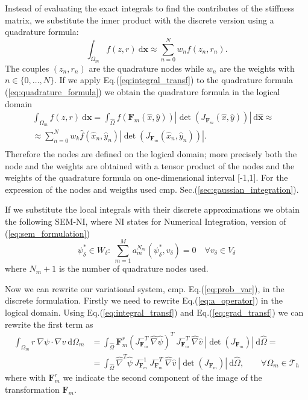 Instead of evaluating the exact integrals to find the contributes of the stiffness matrix, we substitute the inner product with the discrete version using a quadrature formula:
\begin{equation}\label{eq:quadrature_formula}
  \int_{\Omega_m} f(z,r)\:\mathrm{d}\mathbf{x} \approx\sum_{n=0}^{N}w_n f(z_n,r_n).
\end{equation}
The couples $(z_n,r_n)$ are the quadrature nodes while $w_n$ are the weights with $n\in\{0,\dots,N\}$. If we apply Eq.(\ref{eq:integral_transf}) to the quadrature formula (\ref{eq:quadrature_formula}) we obtain the quadrature formula in the logical domain
\begin{equation}
  \begin{split}
    \int_{\Omega_m} f(z,r)\:\mathrm{d}\mathbf{x} =\int_{\hat{\Omega}}f(\mathbf{F}_m(\hat{x},\hat{y}))|\det(J_{\mathbf{F}_m}(\hat{x},\hat{y}))|\:\mathrm{d}\hat{\mathbf{x}}\approx&\\
    \approx\sum_{n=0}^{N}w_k \hat{f}(\hat{x}_n,\hat{y}_n)|\det(J_{\mathbf{F}_m}(\hat{x}_n,\hat{y}_n))|.\\
  \end{split}
\end{equation}
Therefore the nodes are defined on the logical domain; more precisely both the node and the weights are obtained with a tensor product of the nodes and the weights of the quadrature formula
on one-dimensional interval [-1,1]. For the expression of the nodes and weigths used cmp. Sec.(\ref{sec:gaussian_integration}).

If we substitute the local integrals with their discrete approximations we obtain the following SEM-NI, where NI states for Numerical Integration, version of (\ref{eq:sem_formulation})
\begin{equation}\label{eq:SEM_NI}
  \psi^*_\delta\in W_\delta:\: \sum_{m=1}^M a_m^{N_m}(\psi^*_\delta,v_\delta)=0\quad\forall v_\delta\in V_\delta
\end{equation}
where $N_m+1$ is the number of quadrature nodes used.
\medskip

Now we can rewrite our variational system, cmp. Eq.(\ref{eq:prob_var}), in the discrete formulation. Firstly we need to rewrite Eq.(\ref{eq:a_operator}) in the logical domain. Using Eq.(\ref{eq:integral_transf}) and Eq.(\ref{eq:grad_transf}) we can rewrite the first term as
\begin{equation}\label{eq:first_logical}
  \begin{split}
    \int_{\Omega_m}r\:\nabla\psi\cdot\nabla v\:\mathrm{d}\Omega_m &=\int_{\hat{\Omega}} \mathbf{F}^r_m(J_{\mathbf{F}_m}^{-T}\:\hat{\nabla}\hat{\psi})^T\:
    J_{\mathbf{F}_m}^{-T}\:\hat{\nabla}\hat{v}\:|\det(J_{\mathbf{F}_m})|\:\mathrm{d}\hat{\Omega}=\\
    &=\int_{\hat{\Omega}} \hat{\nabla}^T\hat{\psi}\:J_{\mathbf{F}_m}^{-1}\:J_{\mathbf{F}_m}^{-T}\:\hat{\nabla}\hat{v}\:|\det(J_{\mathbf{F}_m})|\:\mathrm{d}\hat{\Omega},\qquad\forall\Omega_m\in\mathcal{T}_h
  \end{split}
\end{equation}
where with $\mathbf{F}_m^r$ we indicate the second component of the image of the transformation $\mathbf{F}_m$.

